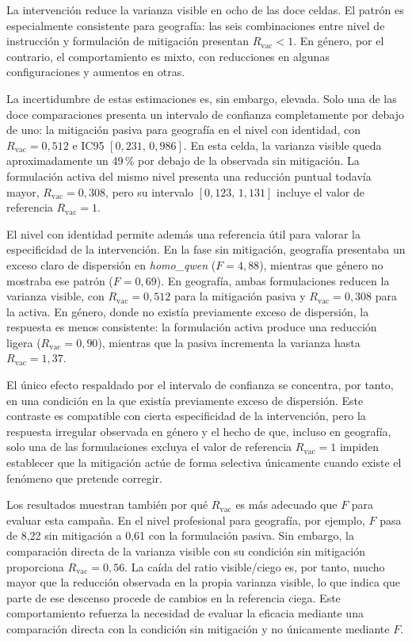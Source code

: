 La intervención reduce la varianza visible en ocho de las doce celdas. El patrón es especialmente consistente para geografía: las seis combinaciones entre nivel de instrucción y formulación de mitigación presentan $R_{\mathrm{vac}}<1$. En género, por el contrario, el comportamiento es mixto, con reducciones en algunas configuraciones y aumentos en otras.

La incertidumbre de estas estimaciones es, sin embargo, elevada. Solo una de las doce comparaciones presenta un intervalo de confianza completamente por debajo de uno: la mitigación pasiva para geografía en el nivel con identidad, con $R_{\mathrm{vac}}=0{,}512$ e IC95 $[0{,}231,\,0{,}986]$. En esta celda, la varianza visible queda aproximadamente un 49\,\% por debajo de la observada sin mitigación. La formulación activa del mismo nivel presenta una reducción puntual todavía mayor, $R_{\mathrm{vac}}=0{,}308$, pero su intervalo $[0{,}123,\,1{,}131]$ incluye el valor de referencia
$R_{\mathrm{vac}}=1$.

El nivel con identidad permite además una referencia útil para valorar la especificidad de la intervención. En la fase sin mitigación, geografía presentaba un exceso claro de dispersión en \textit{homo\_qwen} ($F=4{,}88$), mientras que género no mostraba ese patrón ($F=0{,}69$). En geografía, ambas formulaciones reducen la varianza visible, con $R_{\mathrm{vac}}=0{,}512$ para la mitigación pasiva y $R_{\mathrm{vac}}=0{,}308$ para la activa. En género, donde no existía previamente exceso de dispersión, la respuesta es menos consistente: la formulación activa produce una reducción ligera ($R_{\mathrm{vac}}=0{,}90$), mientras que la pasiva incrementa la varianza hasta $R_{\mathrm{vac}}=1{,}37$.

El único efecto respaldado por el intervalo de confianza se concentra, por tanto, en una condición en la que existía previamente exceso de dispersión. Este contraste es compatible con cierta especificidad de la intervención, pero la respuesta irregular observada en género y el hecho de que, incluso en geografía, solo una de las formulaciones excluya el valor de referencia $R_{\mathrm{vac}}=1$ impiden establecer que la mitigación actúe de forma selectiva únicamente cuando existe el fenómeno que pretende corregir.

Los resultados muestran también por qué $R_{\mathrm{vac}}$ es más adecuado que $F$ para evaluar esta campaña. En el nivel profesional para geografía, por ejemplo, $F$ pasa de 8,22 sin mitigación a 0,61 con la formulación pasiva. Sin embargo, la comparación directa de la varianza visible con su condición sin mitigación proporciona $R_{\mathrm{vac}}=0{,}56$. La caída del ratio visible/ciego es, por tanto, mucho mayor que la reducción observada en la propia varianza visible, lo que indica que parte de ese descenso procede de cambios en la referencia ciega. Este comportamiento refuerza la necesidad de evaluar la eficacia mediante una comparación directa con la condición sin mitigación y no únicamente mediante $F$.

